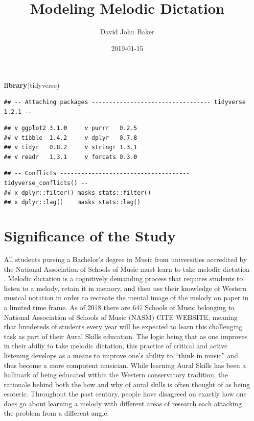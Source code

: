 \documentclass[]{book}
\title{Modeling Melodic Dictation}
\author{David John Baker}
\date{2019-01-15}
\newenvironment{Shaded}{\begin{snugshade}}{\end{snugshade}}
\newcommand{\KeywordTok}[1]{\textcolor[rgb]{0.13,0.29,0.53}{\textbf{#1}}}
\newcommand{\NormalTok}[1]{#1}
\begin{document}
\maketitle

{
\setcounter{tocdepth}{1}
\tableofcontents
}
\begin{Shaded}
\begin{Highlighting}[]
\KeywordTok{library}\NormalTok{(tidyverse)}
\end{Highlighting}
\end{Shaded}

\begin{verbatim}
## -- Attaching packages ---------------------------------- tidyverse 1.2.1 --
\end{verbatim}

\begin{verbatim}
## v ggplot2 3.1.0     v purrr   0.2.5
## v tibble  1.4.2     v dplyr   0.7.8
## v tidyr   0.8.2     v stringr 1.3.1
## v readr   1.3.1     v forcats 0.3.0
\end{verbatim}

\begin{verbatim}
## -- Conflicts ------------------------------------- tidyverse_conflicts() --
## x dplyr::filter() masks stats::filter()
## x dplyr::lag()    masks stats::lag()
\end{verbatim}

\hypertarget{significance-of-the-study}{%
\chapter{Significance of the Study}\label{significance-of-the-study}}

All students pursing a Bachelor's degree in Music from universities accredited by the National Association of Schools of Music must learn to take melodic dictation \citep[ Section VIII.6.B.2.A]{NationalAssociationSchools2018}.
Melodic dictation is a cognitively demanding process that requires students to listen to a melody, retain it in memory, and then use their knowledge of Western musical notation in order to recreate the mental image of the melody on paper in a limited time frame.
As of 2018 there are 647 Schools of Music belonging to National Association of Schools of Music (NASM) CITE WEBSITE, meaning that hundereds of students every year will be expected to learn this challenging task as part of their Aural Skills education.
The logic being that as one improves in their abiliy to take melodic dictation, this practice of critical and active listening develops as a means to improve one's ability to ``think in music'' and thus become a more compotent musician.
While learning Aural Skills has been a hallmark of being educated within the Western conservatory tradition, the rationale behind both the how and why of aural skills is often thought of as being esoteric.
Throughout the past century, people have disagreed on exactly how one does go about learning a melody with different areas of research each attacking the problem from a different angle.
\end{document}
